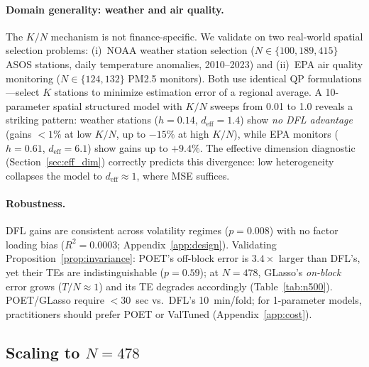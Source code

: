 \documentclass[letterpaper]{article}
\begin{document}
\paragraph{Domain generality: weather and air quality.}
The $K/N$ mechanism is not finance-specific. We validate on two real-world spatial selection problems: (i)~NOAA weather station selection ($N{\in}\{100, 189, 415\}$ ASOS stations, daily temperature anomalies, 2010--2023) and (ii)~EPA air quality monitoring ($N{\in}\{124, 132\}$ PM2.5 monitors). Both use identical QP formulations---select $K$ stations to minimize estimation error of a regional average. A 10-parameter spatial structured model with $K/N$ sweeps from 0.01 to 1.0 reveals a striking pattern: weather stations ($h{=}0.14$, $d_{\text{eff}}{=}1.4$) show \emph{no DFL advantage} (gains $< 1\%$ at low $K/N$, up to $-15\%$ at high $K/N$), while EPA monitors ($h{=}0.61$, $d_{\text{eff}}{=}6.1$) show gains up to $+9.4\%$. The effective dimension diagnostic (Section~\ref{sec:eff_dim}) correctly predicts this divergence: low heterogeneity collapses the model to $d_{\text{eff}} \approx 1$, where MSE suffices.

\paragraph{Robustness.} DFL gains are consistent across volatility regimes ($p = 0.008$) with no factor loading bias ($R^2 = 0.0003$; Appendix~\ref{app:design}). Validating Proposition~\ref{prop:invariance}: POET's off-block error is $3.4\times$ larger than DFL's, yet their TEs are indistinguishable ($p = 0.59$); at $N{=}478$, GLasso's \emph{on-block} error grows ($T/N \approx 1$) and its TE degrades accordingly (Table~\ref{tab:n500}). POET/GLasso require $<$30~sec vs.\ DFL's 10~min/fold; for 1-parameter models, practitioners should prefer POET or ValTuned (Appendix~\ref{app:cost}).

\subsection{Scaling to $N = 478$}
\end{document}
